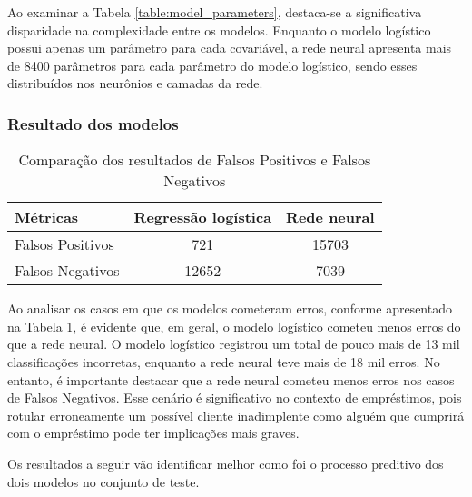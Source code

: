 Ao examinar a Tabela \ref{table:model_parameters}, destaca-se a significativa disparidade na
complexidade entre os modelos. Enquanto o modelo logístico possui apenas um parâmetro para cada covariável,
a rede neural apresenta mais de 8400 parâmetros para cada parâmetro do modelo logístico,  
sendo esses distribuídos nos neurônios e camadas da rede.

\subsubsection{Resultado dos modelos}

\begin{table}[H]
  \centering
  \begin{tabular}{lcc}
    \hline
    \textbf{Métricas} & \textbf{Regressão logística} & \textbf{Rede neural} \\
    \hline
    Falsos Positivos   & 721                     & 15703 \\
    Falsos Negativos   & 12652                   & 7039 \\
    \hline
  \end{tabular}
  \caption{Comparação dos resultados de Falsos Positivos e Falsos Negativos}
  \label{tab:false_positives_negatives}
\end{table}

Ao analisar os casos em que os modelos cometeram erros, conforme apresentado na Tabela \ref{tab:false_positives_negatives}, 
é evidente que, em geral, o modelo logístico cometeu menos erros do que a rede neural. O modelo logístico registrou um total 
de pouco mais de 13 mil classificações incorretas, enquanto a rede neural teve mais de 18 mil erros.
 No entanto, é importante destacar que a rede neural cometeu menos erros nos casos de Falsos Negativos.
  Esse cenário é significativo no contexto de empréstimos, pois rotular erroneamente um possível cliente
   inadimplente como alguém que cumprirá com o empréstimo pode ter implicações mais graves.

Os resultados a seguir vão identificar melhor como foi o processo preditivo dos dois modelos no conjunto de teste.


